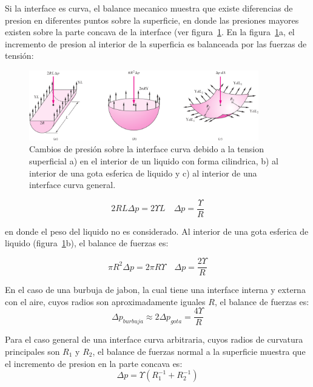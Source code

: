 \documentclass[10pt, oneside]{article}
\begin{document}
Si la interface es curva, el balance mecanico muestra que existe diferencias de presion en diferentes puntos sobre la superficie, en donde las presiones mayores existen sobre la parte concava de la interface (ver figura~\ref{tesu}. En la figura~\ref{tesu}a, el incremento de presion al interior de la superficia es balanceada por las fuerzas de tensi\'on:

\begin{figure}[h]
\centering
\includegraphics[width=10cm]{tesu}
\caption{Cambios de presi\'on sobre la interface curva debido a la tension superficial a) en el interior de un liquido con forma cilindrica, b) al interior de una gota esferica de liquido y c) al interior de una interface curva general.}
\label{tesu}
\end{figure}

\begin{equation}
2RL \Delta p = 2 \Upsilon L \quad \Delta p = \frac{\Upsilon}{R}
\end{equation}

en donde el peso del liquido no es considerado. Al interior de una gota esferica de liquido (figura~\ref{tesu}b), el balance de fuerzas es:

\begin{equation}
\pi R^2 \Delta p = 2 \pi R \Upsilon \quad \Delta p = \frac{2\Upsilon}{R}
\end{equation}

En el caso de una burbuja de jabon, la cual tiene una interface interna y externa con el aire, cuyos radios son aproximadamente iguales $R$, el balance de fuerzas es:
\begin{equation}
\Delta p_{burbuja} \approx 2 \Delta p_{gota} = \frac{4\Upsilon}{R}
\end{equation}

Para el caso general de una interface curva arbitraria, cuyos radios de curvatura principales son $R_1$ y $R_2$, el balance de fuerzas normal a la superficie  muestra que el incremento de presion en la parte concava es:
\begin{equation}
\Delta p = \Upsilon (R^{-1}_1 + R^{-1}_2)
\label{ts1}
\end{equation}
\end{document}
